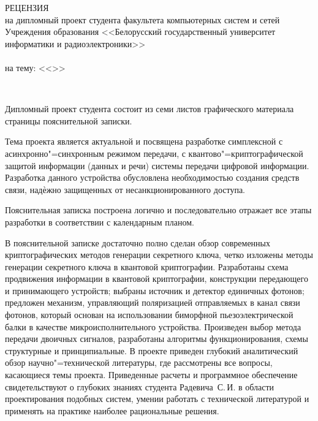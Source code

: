 \documentclass[]{lib/styles/additional-docs}
\begin{document}
\begin{singlespace}
  {\small
    \begin{center}
      \begin{minipage}{0.9\textwidth}
        \begin{center}
          {РЕЦЕНЗИЯ}\\[0.2cm]
          на дипломный проект студента факультета компьютерных систем и сетей Учреждения образования <<Белорусский государственный университет информатики и радиоэлектроники>>\\
          \meLongInclined \\
          на тему: <<\topicName>>
        \end{center}
      \end{minipage}\\
    \end{center}
  
  Дипломный проект студента \me состоит из семи листов графического материала страницы пояснительной записки.
  
  Тема проекта является актуальной и посвящена разработке симплексной с асинхронно"=синхронным режимом передачи, с квантово"=криптографической защитой информации (данных и речи) системы передачи цифровой информации. 
  Разработка данного устройства обусловлена необходимостью создания средств связи, надѐжно защищенных от несанкционированного доступа.
  
  Пояснительная записка построена логично и последовательно отражает все этапы разработки в соответствии с календарным планом.
  
  В пояснительной записке достаточно полно сделан обзор современных криптографических методов генерации секретного ключа, четко изложены методы генерации секретного
  ключа в квантовой криптографии.
  Разработаны схема продвижения информации в квантовой криптографии, конструкции передающего и принимающего устройств; выбраны источник и детектор единичных фотонов; предложен механизм, управляющий поляризацией отправляемых в канал связи фотонов, который основан на использовании биморфной пьезоэлектрической балки в качестве микроисполнительного устройства. 
  Произведен выбор метода передачи двоичных сигналов, разработаны алгоритмы функционирования, схемы структурные и принципиальные.
  В проекте приведен глубокий аналитический обзор научно"=технической литературы, где рассмотрены все вопросы, касающиеся темы проекта.
  Приведенные расчеты и программное обеспечение свидетельствуют о глубоких знаниях студента Радевича~С.\,И. в области проектирования подобных систем, умении работать с технической литературой и применять на практике наиболее рациональные решения.
  
}
\end{singlespace}
\end{document}
